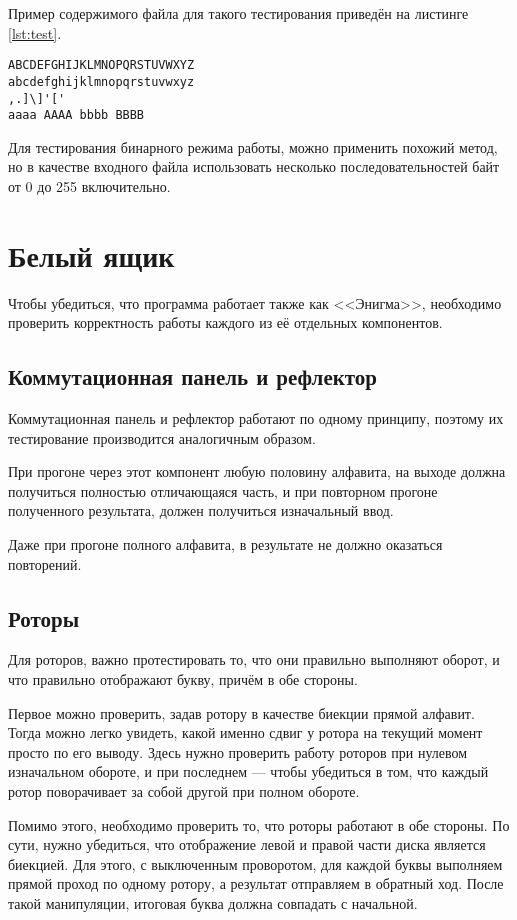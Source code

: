 \documentclass[14pt, oneside, a4paper]{extreport}
\begin{document}
Пример содержимого файла для такого тестирования приведён на листинге \ref{lst:test}.
\begin{lstlisting}[caption={Содержимое файла для тестирования программы в режиме работы с алфавитом}, label={lst:test}]
ABCDEFGHIJKLMNOPQRSTUVWXYZ
abcdefghijklmnopqrstuvwxyz
,.]\]'['
aaaa AAAA bbbb BBBB
\end{lstlisting}

Для тестирования бинарного режима работы, можно применить похожий метод, но в качестве входного файла использовать несколько последовательностей байт от 0 до 255 включительно.

\section{Белый ящик}
Чтобы убедиться, что программа работает также как <<Энигма>>, необходимо проверить корректность работы каждого из её отдельных компонентов.

\subsection{Коммутационная панель и рефлектор}
Коммутационная панель и рефлектор работают по одному принципу, поэтому их тестирование производится аналогичным образом.

При прогоне через этот компонент любую половину алфавита, на выходе должна получиться полностью отличающаяся часть, и при повторном прогоне полученного результата, должен получиться изначальный ввод.

Даже при прогоне полного алфавита, в результате не должно оказаться повторений.

\subsection{Роторы}
Для роторов, важно протестировать то, что они правильно выполняют оборот, и что правильно отображают букву, причём в обе стороны.

Первое можно проверить, задав ротору в качестве биекции прямой алфавит. Тогда можно легко увидеть, какой именно сдвиг у ротора на текущий момент просто по его выводу. Здесь нужно проверить работу роторов при нулевом изначальном обороте, и при последнем --- чтобы убедиться в том, что каждый ротор поворачивает за собой другой при полном обороте.

Помимо этого, необходимо проверить то, что роторы работают в обе стороны. По сути, нужно убедиться, что отображение левой и правой части диска является биекцией. Для этого, с выключенным проворотом, для каждой буквы выполняем прямой проход по одному ротору, а результат отправляем в обратный ход. После такой манипуляции, итоговая буква должна совпадать с начальной.


%
%
\end{document}
